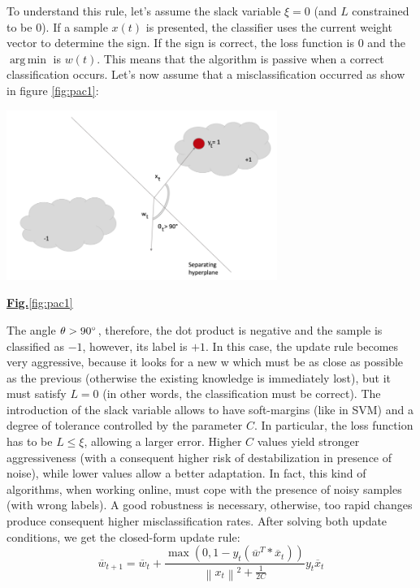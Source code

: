 \documentclass[11.5pt]{article}
\newcommand\norm[1]{\left\lVert#1\right\rVert}
\DeclareMathOperator*{\argmin}{arg\,min}
\begin{document}
\begin{multicols}{2}
To understand this rule, let’s assume the slack variable $\xi=0$ (and $L$ constrained to be $0$). If a sample $x(t)$ is presented, the classifier uses the current weight vector to determine the sign. If the sign is correct, the loss function is $0$ and the $\argmin$ is $w(t)$. This means that the algorithm is passive when a correct classification occurs. Let’s now assume that a misclassification occurred as show in figure \ref{fig:pac1}:
\begin{center}
    \centering
    \includegraphics[width=8.8cm]{PAC1.png}
    \caption{\underline{\textbf{Fig.}\ref{fig:pac1}}}
    \label{fig:pac1}
\end{center}
The angle $\theta > 90\degree$, therefore, the dot product is negative and the sample is classified as $-1$, however, its label is $+1$. In this case, the update rule becomes very aggressive, because it looks for a new w which must be as close as possible as the previous (otherwise the existing knowledge is immediately lost), but it must satisfy $L=0$ (in other words, the classification must be correct).
\newline
The introduction of the slack variable allows to have soft-margins (like in SVM) and a degree of tolerance controlled by the parameter $C$. In particular, the loss function has to be $L \leq \xi$, allowing a larger error. Higher $C$ values yield stronger aggressiveness (with a consequent higher risk of destabilization in presence of noise), while lower values allow a better adaptation. In fact, this kind of algorithms, when working online, must cope with the presence of noisy samples (with wrong labels). A good robustness is necessary, otherwise, too rapid changes produce consequent higher misclassification rates.
\newline
After solving both update conditions, we get the closed-form update rule:
\begin{equation}
    \overline{w}_{t+1} = \overline{w}_t + \frac{\max(0, 1 - y_t(\overline{w}^T * \overline{x}_t))}{\norm{x_t}^2 + \frac{1}{2C}} y_t \overline{x}_t

\end{equation}
\end{multicols}
\end{document}
